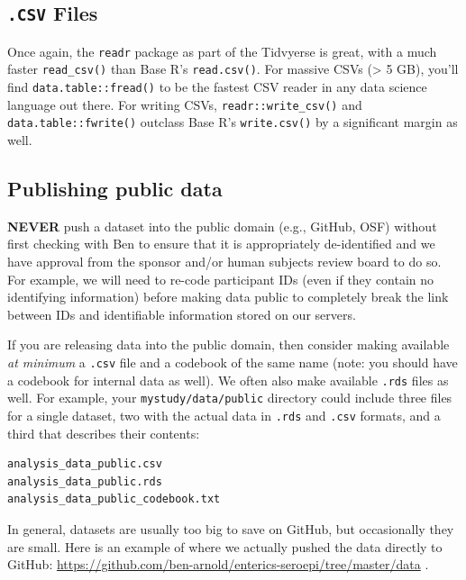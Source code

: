 \documentclass[]{book}
\begin{document}
\hypertarget{csv-files}{%
\subsection{\texorpdfstring{\texttt{.CSV} Files}{.CSV Files}}\label{csv-files}}

Once again, the \texttt{readr} package as part of the Tidvyerse is great, with a much faster \texttt{read\_csv()} than Base R's \texttt{read.csv()}. For massive CSVs (\textgreater{} 5 GB), you'll find \texttt{data.table::fread()} to be the fastest CSV reader in any data science language out there. For writing CSVs, \texttt{readr::write\_csv()} and \texttt{data.table::fwrite()} outclass Base R's \texttt{write.csv()} by a significant margin as well.

\hypertarget{publishing-public-data}{%
\subsection{Publishing public data}\label{publishing-public-data}}

\textbf{NEVER} push a dataset into the public domain (e.g., GitHub, OSF) without first checking with Ben to ensure that it is appropriately de-identified and we have approval from the sponsor and/or human subjects review board to do so. For example, we will need to re-code participant IDs (even if they contain no identifying information) before making data public to completely break the link between IDs and identifiable information stored on our servers.

If you are releasing data into the public domain, then consider making available \emph{at minimum} a \texttt{.csv} file and a codebook of the same name (note: you should have a codebook for internal data as well). We often also make available \texttt{.rds} files as well. For example, your \texttt{mystudy/data/public} directory could include three files for a single dataset, two with the actual data in \texttt{.rds} and \texttt{.csv} formats, and a third that describes their contents:

\begin{verbatim}
analysis_data_public.csv
analysis_data_public.rds
analysis_data_public_codebook.txt
\end{verbatim}

In general, datasets are usually too big to save on GitHub, but occasionally they are small. Here is an example of where we actually pushed the data directly to GitHub: \url{https://github.com/ben-arnold/enterics-seroepi/tree/master/data} .
\end{document}
